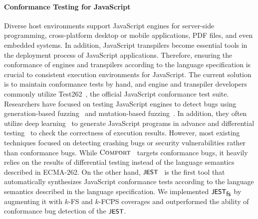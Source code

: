 \paragraph{\textbf{Conformance Testing for JavaScript}}
%
Diverse host environments support JavaScript engines for server-side
programming, cross-platform desktop or mobile applications, PDF files, and even
embedded systems.
%
In addition, JavaScript transpilers become essential tools in the deployment
process of JavaScript applications.
%
Therefore, ensuring the conformance of engines and transpilers according to the
language specification is crucial to consistent execution environments for
JavaScript.
%
The current solution is to maintain conformance tests by hand, and engine and
transpiler developers commonly utilize Test262~\cite{test262}, the official
JavaScript conformance test suite.
%
Researchers have focused on testing JavaScript engines to detect bugs using
generation-based fuzzing~\cite{die, codealchemist, favocado, sofi} and
mutation-based fuzzing~\cite{die, codealchemist, ifuzzer, superion}.
%
In addition, they often utilize deep learning~\cite{montage, comfort} to
generate JavaScript programs in advance and differential
testing~\cite{jit-picking} to check the correctness of execution results.
%
However, most existing techniques focused on detecting crashing bugs or security
vulnerabilities rather than conformance bugs.
%
While $\textsc{Comfort}$~\cite{comfort} targets conformance bugs, it heavily relies on
the results of differential testing instead of the language semantics described
in ECMA-262.
%
On the other hand, $\textsf{\small JEST}$~\cite{jest} is the first tool that automatically
synthesizes JavaScript conformance tests according to the language semantics
described in the language specification.
%
We implemented $\textsf{\small JEST}_{\textsf{\small fs}}$ by augmenting it with $k$-FS and $k$-FCPS coverages and
outperformed the ability of conformance bug detection of the $\textsf{\small JEST}$.
